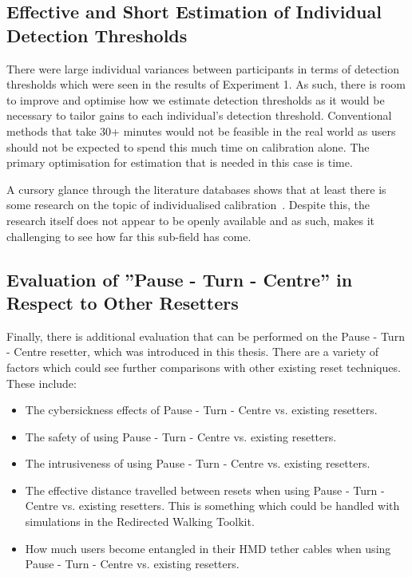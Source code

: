 \subsection{Effective and Short Estimation of Individual Detection Thresholds}   
There were large individual variances between participants in terms of detection thresholds which were seen in the results of Experiment 1. As such, there is room to improve and optimise how we estimate detection thresholds as it would be necessary to tailor gains to each individual's detection threshold. Conventional methods that take 30+ minutes would not be feasible in the real world as users should not be expected to spend this much time on calibration alone. The primary optimisation for estimation that is needed in this case is time. 

A cursory glance through the literature databases shows that at least there is some research on the topic of individualised calibration~\cite{hutton2018individualized}. Despite this, the research itself does not appear to be openly available and as such, makes it challenging to see how far this sub-field has come. 

\subsection{Evaluation of ''Pause - Turn - Centre'' in Respect to Other Resetters}
Finally, there is additional evaluation that can be performed on the Pause - Turn - Centre resetter, which was introduced in this thesis. There are a variety of factors which could see further comparisons with other existing reset techniques. These include:

\begin{itemize}
    \item The cybersickness effects of Pause - Turn - Centre vs. existing resetters.
    \item The safety of using Pause - Turn - Centre vs. existing resetters.
    \item The intrusiveness of using Pause - Turn - Centre vs. existing resetters.
    \item The effective distance travelled between resets when using Pause - Turn - Centre vs. existing resetters. This is something which could be handled with simulations in the Redirected Walking Toolkit. 
    \item How much users become entangled in their HMD tether cables when using Pause - Turn - Centre vs. existing resetters.
\end{itemize}


